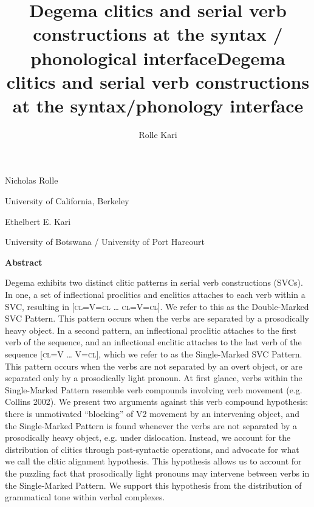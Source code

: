 \documentclass[output=paper]{langsci/langscibook}
\title{Degema clitics and serial verb constructions at the syntax / phonological interface}
\author{%
 Rolle\affiliation{}\lastand 
 Kari \affiliation{}
}
\begin{document}
\title{Degema clitics and serial verb constructions at the syntax/phonology interface}

\begin{styleNoSpacing}
Nicholas Rolle
\end{styleNoSpacing}

\begin{styleNoSpacing}
University of California, Berkeley
\end{styleNoSpacing}

\begin{styleNoSpacing}
Ethelbert E. Kari
\end{styleNoSpacing}

\begin{styleNoSpacing}
University of Botswana / University of Port Harcourt
\end{styleNoSpacing}

\begin{styleNoSpacing}\bfseries
Abstract
\end{styleNoSpacing}

\begin{stylelsAbstract}
Degema exhibits two distinct clitic patterns in serial verb constructions (SVCs). In one, a set of inflectional proclitics and enclitics attaches to each verb within a SVC, resulting in [\textsc{cl=}V\textsc{=cl} … \textsc{cl=}V\textsc{=cl}]. We refer to this as the Double-Marked SVC Pattern. This pattern occurs when the verbs are separated by a prosodically heavy object. In a second pattern, an inflectional proclitic attaches to the first verb of the sequence, and an inflectional enclitic attaches to the last verb of the sequence [\textsc{cl=}V … V\textsc{=cl}], which we refer to as the Single-Marked SVC Pattern. This pattern occurs when the verbs are not separated by an overt object, or are separated only by a prosodically light pronoun. At first glance, verbs within the Single-Marked Pattern resemble verb compounds involving verb movement (e.g. Collins 2002). We present two arguments against this verb compound hypothesis: there is unmotivated “blocking” of V2 movement by an intervening object, and the Single-Marked Pattern is found whenever the verbs are not separated by a prosodically heavy object, e.g. under dislocation. Instead, we account for the distribution of clitics through post-syntactic operations, and advocate for what we call the clitic alignment hypothesis. This hypothesis allows us to account for the puzzling fact that prosodically light pronouns may intervene between verbs in the Single-Marked Pattern. We support this hypothesis from the distribution of grammatical tone within verbal complexes.
\end{stylelsAbstract}
\end{document}
